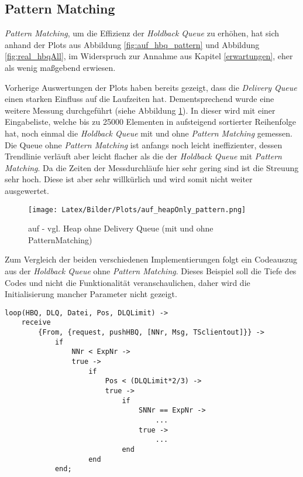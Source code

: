 \subsection{Pattern Matching}
\textit{Pattern Matching}, um die Effizienz der \textit{Holdback Queue} zu erhöhen, hat sich anhand der Plots aus Abbildung \ref{fig:auf_hbq_pattern} und Abbildung \ref{fig:real_hbqAll}, im Widerspruch zur Annahme aus Kapitel \ref{erwartungen}, eher als wenig maßgebend erwiesen. 

Vorherige Auswertungen der Plots haben bereits gezeigt, dass die \textit{Delivery Queue} einen starken Einfluss auf die Laufzeiten hat. Dementsprechend wurde eine weitere Messung durchgeführt (siehe Abbildung \ref{fig:auf_hbqOnly_pattern}). In dieser wird mit einer Eingabeliste, welche bis zu 25000 Elementen in aufsteigend sortierter Reihenfolge hat, noch einmal die \textit{Holdback Queue} mit und ohne \textit{Pattern Matching} gemessen. Die Queue ohne \textit{Pattern Matching} ist anfangs noch leicht ineffizienter, dessen Trendlinie verläuft aber leicht flacher als die der \textit{Holdback Queue} mit \textit{Pattern Matching}. Da die Zeiten der Messdurchläufe hier sehr gering sind ist die Streuung sehr hoch. Diese ist aber sehr willkürlich und wird somit nicht weiter ausgewertet.

\begin{figure}[htbp]
\begin{center}
\texttt{[image: Latex/Bilder/Plots/auf\_heapOnly\_pattern.png]}
\caption{\label{fig:auf_hbqOnly_pattern} auf - vgl. Heap ohne Delivery Queue (mit und ohne PatternMatching)} 
\end{center}
\end{figure}

\newpage 
Zum Vergleich der beiden verschiedenen Implementierungen folgt ein Codeauszug aus der \textit{Holdback Queue} ohne \textit{Pattern Matching}. Dieses Beispiel soll die Tiefe des Codes und nicht die Funktionalität veranschaulichen, daher wird die Initialisierung mancher Parameter nicht gezeigt. \\

\begin{lstlisting}
loop(HBQ, DLQ, Datei, Pos, DLQLimit) ->
	receive
		{From, {request, pushHBQ, [NNr, Msg, TSclientout]}} ->
			if 
				NNr < ExpNr ->
				true ->
					if
						Pos < (DLQLimit*2/3) ->
						true -> 
							if
								SNNr == ExpNr ->
								    ...
								true ->									
									...
					        end
			        end
	        end;
\end{lstlisting}


